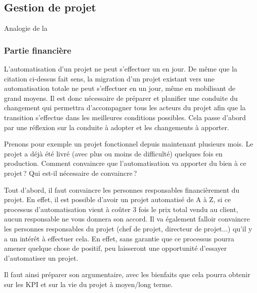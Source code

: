 \subsection{Gestion de projet}

\epigraph{}{Analogie de la }

\subsubsection{Partie financière}
L'automatisation d'un projet ne peut s'effectuer un en jour. De même que la citation ci-dessus fait sens, la migration d'un projet existant vers une automatisation totale ne peut s'effectuer en un jour, même en mobilisant de grand moyens. Il est donc nécessaire de préparer et planifier une conduite du changement qui permettra d'accompagner tous les acteurs du projet afin que la transition s'effectue dans les meilleures conditions possibles. Cela passe d'abord par une réflexion sur la conduite à adopter et les changements à apporter. 

Prenons pour exemple un projet fonctionnel depuis maintenant plusieurs mois. Le projet a déjà été livré (avec plus ou moins de difficulté) quelques fois en production. Comment convaincre que l'automatisation va apporter du bien à ce projet ? Qui est-il nécessaire de convaincre ?

Tout d'abord, il faut convaincre les personnes responsables financièrement du projet. En effet, il est possible d'avoir un projet automatisé de A à Z, si ce processus d'automatisation vient à coûter 3 fois le prix total vendu au client, aucun responsable ne vous donnera son accord. Il va également falloir convaincre les personnes responsables du projet (chef de projet, directeur de projet...) qu'il y a un intérêt à effectuer cela. En effet, sans garantie que ce processus pourra amener quelque chose de positif, peu laisseront une opportunité d'essayer d'automatiser un projet.

Il faut ainsi préparer son argumentaire, avec les bienfaits que cela pourra obtenir sur les \gls{KPI} et sur la vie du projet à moyen/long terme.

